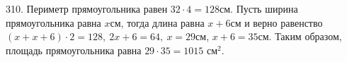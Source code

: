 310. Периметр прямоугольника равен $32\cdot4=128$см. Пусть ширина прямоугольника равна $x$см, тогда длина равна $x+6$см и верно равенство $(x+x+6)\cdot2=128,\ 2x+6=64,\ x=29$см, $x+6=35$см. Таким образом, площадь прямоугольника равна $29\cdot35=1015\text{ см}^2.$\\
